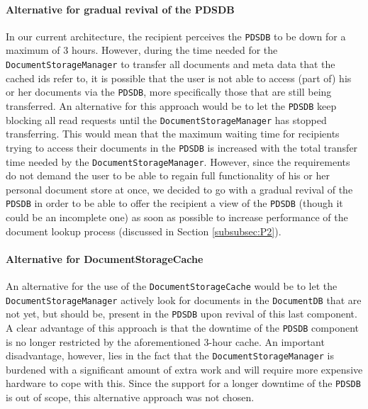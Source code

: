 \documentclass[a4paper,10pt]{article}
\begin{document}
\paragraph{Alternative for gradual revival of the PDSDB}
In our current architecture, the recipient perceives the \texttt{PDSDB} to be down for a maximum of 3 hours. However, during the time needed for the \texttt{DocumentStorageManager} to transfer all documents and meta data that the cached ids refer to, it is possible that the user is not able to access (part of) his or her documents via the \texttt{PDSDB}, more specifically those that are still being transferred. An alternative for this approach would be to let the \texttt{PDSDB} keep blocking all read requests until the \texttt{DocumentStorageManager} has stopped transferring. This would mean that the maximum waiting time for recipients trying to access their documents in the \texttt{PDSDB} is increased with the total transfer time needed by the \texttt{DocumentStorageManager}. However, since the requirements do not demand the user to be able to regain full functionality of his or her personal document store at once, we decided to go with a gradual revival of the \texttt{PDSDB} in order to be able to offer the recipient a view of the \texttt{PDSDB} (though it could be an incomplete one) as soon as possible to increase performance of the document lookup process (discussed in Section \ref{subsubsec:P2}).
\paragraph{Alternative for DocumentStorageCache}
An alternative for the use of the \texttt{DocumentStorageCache} would be to let the \texttt{DocumentStorageManager} actively look for documents in the \texttt{DocumentDB} that are not yet, but should be, present in the \texttt{PDSDB} upon revival of this last component. A clear advantage of this approach is that the downtime of the \texttt{PDSDB} component is no longer restricted by the aforementioned 3-hour cache. An important disadvantage, however, lies in the fact that the \texttt{DocumentStorageManager} is burdened with a significant amount of extra work and will require more expensive hardware to cope with this. Since the support for a longer downtime of the \texttt{PDSDB} is out of scope, this alternative approach was not chosen.
\end{document}

